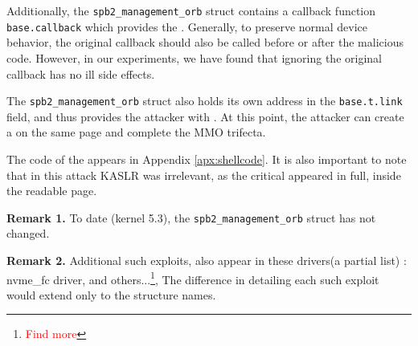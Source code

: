 Additionally, the \texttt{spb2\_management\_orb} struct contains a callback function \texttt{base.callback} which provides the \oportunity{}. Generally, to preserve normal device behavior, the original callback should also be called before or after the malicious code. However, in our experiments, we have found that ignoring the original callback has no ill side effects. 

The \texttt{spb2\_management\_orb} struct also holds its own address in the \texttt{base.t.link} field, and thus provides the attacker with \means{}. At this point, the attacker can create a \mabaf{} on the same page and complete the MMO trifecta. 

The code of the \mabaf{} appears in Appendix \ref{apx:shellcode}. It is also important to note that in this attack KASLR was irrelevant, as the critical \kva{} appeared in full, inside the readable page.

\smallskip
\noindent \textbf{Remark 1.} To date (kernel 5.3), the \texttt{spb2\_management\_orb} struct has not changed.

\smallskip
\noindent \textbf{Remark 2.} Additional such exploits, also appear in these drivers(a partial list) : nvme\_fc driver, and others...\footnote{\textcolor{red}{Find more}},
The difference in detailing each such exploit would extend only to the structure names. 